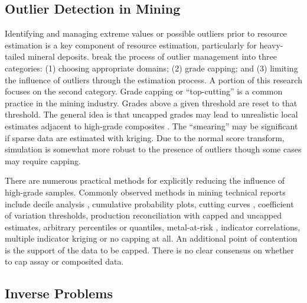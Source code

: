 \FloatBarrier
\subsection{Outlier Detection in Mining}
\label{subsec:01miningoutlier}

Identifying and managing extreme values or possible outliers prior to resource estimation is a key component of resource estimation, particularly for heavy-tailed mineral deposits. \cite{leuangthong2015dealing} break the process of outlier management into three categories: (1) choosing appropriate domains; (2) grade capping; and (3) limiting the influence of outliers through the estimation process. A portion of this research focuses on the second category. Grade capping or ``top-cutting'' is a common practice in the mining industry. Grades above a given threshold are reset to that threshold. The general idea is that uncapped grades may lead to unrealistic local estimates adjacent to high-grade composites \citep{nowak2013suggestions}. The ``smearing'' may be significant if sparse data are estimated with kriging. Due to the normal score transform, simulation is somewhat more robust to the presence of outliers though some cases may require capping.

There are numerous practical methods for explicitly reducing the influence of high-grade samples. Commonly observed methods in mining technical reports \citep{harding2021outlier} include decile analysis \citep{parrish1997geologist}, cumulative probability plots, cutting curves \citep{roscoe1996cutting}, coefficient of variation thresholds, production reconciliation with capped and uncapped estimates, arbitrary percentiles or quantiles, metal-at-risk \citep{parker2006}, indicator correlations, multiple indicator kriging or no capping at all. An additional point of contention is the support of the data to be capped. There is no clear consensus on whether to cap assay or composited data.

\FloatBarrier
\subsection{Inverse Problems}
\label{subsec:03inverse}




